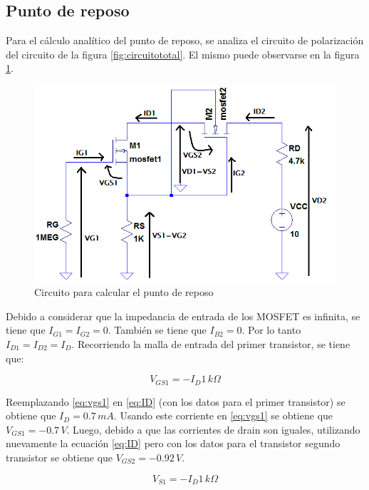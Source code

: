 \documentclass[10pt,spanish,a4paper,notitlepage]{article}
\begin{document}
\subsection{Punto de reposo}

Para el cálculo analítico del punto de reposo, se analiza el circuito de polarización del circuito de la figura \ref{fig:circuitototal}. El mismo puede observarse en la figura \ref{fig:circuitoreposo}.

\begin{figure}[H]
\centering
\includegraphics[scale=0.8]{circuitos/reposoanalitico.png}
\caption{Circuito para calcular el punto de reposo}
\label{fig:circuitoreposo}
\end{figure}

Debido a considerar que la impedancia de entrada de los MOSFET es infinita, se tiene que $I_{G1}=I_{G2}=0$. También se tiene que $I_{B2}=0$. Por lo tanto $I_{D1}=I_{D2}=I_D$. Recorriendo la malla de entrada del primer transistor, se tiene que:

\begin{equation}
    V_{GS1}=-I_D 1\,\unit{k\Omega}
    \label{eq:vgs1}
\end{equation}

Reemplazando \ref{eq:vgs1} en \ref{eq:ID} (con los datos para el primer transistor) se obtiene que $I_D=0.7\,\unit{mA}$. Usando este corriente en \ref{eq:vgs1} se obtiene que $V_{GS1}=-0.7\,\unit{V}$. Luego, debido a que las corrientes de drain son iguales, utilizando nuevamente la ecuación \ref{eq:ID} pero con los datos para el transistor segundo transistor se obtiene que $V_{GS2}=-0.92\,\unit{V}$. 

\begin{equation}
    V_{S1}=-I_D 1\,\unit{k\Omega}
    \label{eq:vs1}
\end{equation}
\end{document}
